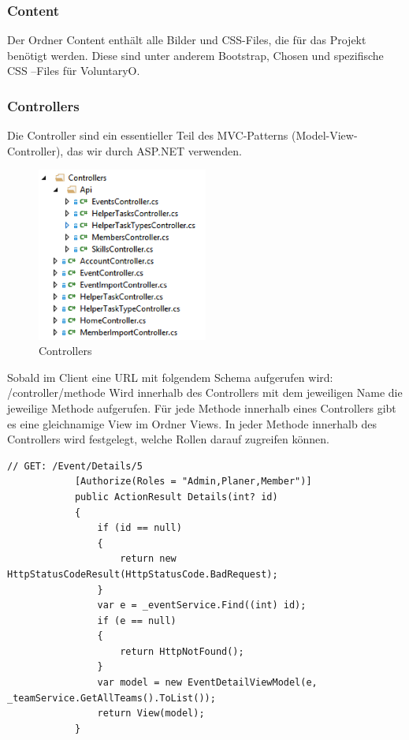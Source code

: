 		\subsubsection{Content}
			Der Ordner Content enthält alle Bilder und CSS-Files, die für das Projekt benötigt werden. Diese sind unter anderem Bootstrap, Chosen und spezifische CSS –Files für VoluntaryO.

		\subsubsection{Controllers}
			Die Controller sind ein essentieller Teil des MVC-Patterns (Model-View-Controller), das wir durch ASP.NET verwenden.

			\begin{figure}[H]
		    	\centering
		    	 \includegraphics[width=0.5\textwidth]{content/architekturdokumentation/images/web-2-Controllers.png}
		  		\vspace{-5pt}
				\caption{Controllers}
			\end{figure}

			Sobald im Client eine URL mit folgendem Schema aufgerufen wird:
			/{controller}/{methode}
			Wird innerhalb des Controllers mit dem jeweiligen Name die jeweilige Methode aufgerufen. Für jede Methode innerhalb eines Controllers gibt es eine gleichnamige View im Ordner Views.
			In jeder Methode innerhalb des Controllers wird festgelegt, welche Rollen darauf zugreifen können.

			\begin{lstlisting}[language=CSharp, caption=EventController.cs, label=lst:Details firstnumber=1]
			// GET: /Event/Details/5
	        [Authorize(Roles = "Admin,Planer,Member")]
	        public ActionResult Details(int? id)
	        {
	            if (id == null)
	            {
	                return new HttpStatusCodeResult(HttpStatusCode.BadRequest);
	            }
	            var e = _eventService.Find((int) id);
	            if (e == null)
	            {
	                return HttpNotFound();
	            }
	            var model = new EventDetailViewModel(e, _teamService.GetAllTeams().ToList());
	            return View(model);
	        }
			\end{lstlisting}

